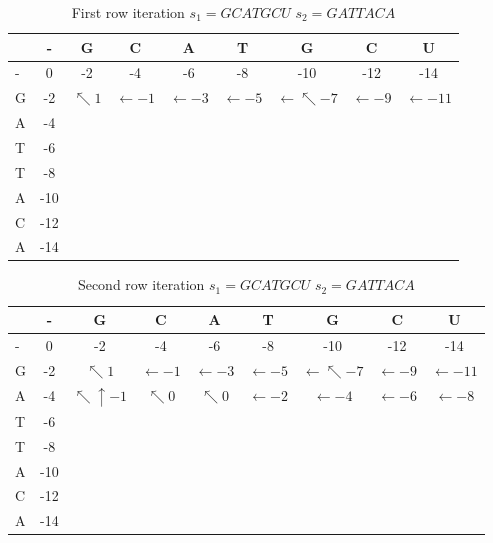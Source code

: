 \documentclass[11pt]{article}
\begin{document}
\begin{table}[h]
	\caption{First row iteration $s_1 = GCATGCU$ $s_2 = GATTACA$}
	\label{tab:fstrow_NW}
	\centering

	\begin{tabular}{l|c ccccccc}
	\hline

	\hline
		  & - & G & C & A & T & G & C & U \\
	\hline
	 	- & 0  & -2& -4& -6& -8&-10&-12&-14\\
	 	G & -2 &$\nwarrow 1$ & $\leftarrow -1$ & $\leftarrow -3$ & $\leftarrow -5$ &  $\leftarrow \nwarrow -7$ & $\leftarrow -9$ & $\leftarrow -11$ \\

	 	A & -4 &   &   &   &   &   &   &   \\
	 	T & -6 &   &   &   &   &   &   &   \\
	 	T & -8 &   &   &   &   &   &   &   \\
	 	A & -10&   &   &   &   &   &   &   \\
	 	C & -12&   &   &   &   &   &   &   \\
	 	A & -14&   &   &   &   &   &   &   \\
	

	\hline
	\end{tabular}
\end{table}

\begin{table}[h!]
	\caption{Second row iteration $s_1 = GCATGCU$ $s_2 = GATTACA$}
	\label{tab:sndrow_NW}
	\centering

	\begin{tabular}{l|c ccccccc}
	\hline

	\hline
		  & - & G & C & A & T & G & C & U \\
	\hline
	 	- & 0  & -2& -4& -6& -8&-10&-12&-14\\
	 	G & -2 &$\nwarrow 1$ & $\leftarrow -1$ & $\leftarrow -3$ & $\leftarrow -5$ &  $\leftarrow \nwarrow -7$ & $\leftarrow -9$ & $\leftarrow -11$ \\

	 	A & -4 & $ \nwarrow \uparrow -1$ &  $\nwarrow 0$ & $\nwarrow 0$ & $\leftarrow -2$ & $\leftarrow -4$ & $\leftarrow -6$ & $\leftarrow -8$ \\

	 	T & -6 &   &   &   &   &   &   &   \\
	 	T & -8 &   &   &   &   &   &   &   \\
	 	A & -10&   &   &   &   &   &   &   \\
	 	C & -12&   &   &   &   &   &   &   \\
	 	A & -14&   &   &   &   &   &   &   \\
	

	\hline
	\end{tabular}
\end{table}
\end{document}
